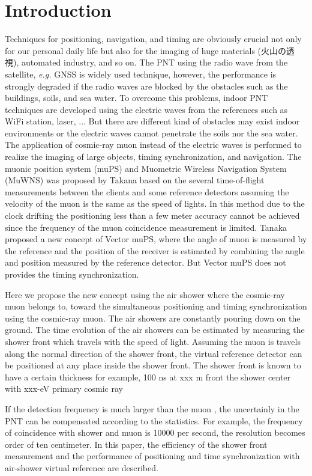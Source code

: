 \section{Introduction}


Techniques for positioning, navigation, and timing are obviously crucial not only for our personal daily life but also for the imaging of huge materials (火山の透視), automated industry, and so on. The PNT using the radio wave from the satellite, {\it e.g.} GNSS is widely used technique, however, the performance is strongly degraded if the radio waves are blocked by the obstacles such as the buildings, soils, and sea water. To overcome this problems, indoor PNT techniques are developed using the electric waves from the references such as WiFi station, laser, ... But there are different kind of obstacles may exist indoor environments or the electric waves cannot penetrate the soils nor the sea water. The application of cosmic-ray muon instead of the electric waves is performed to realize the imaging of large  objects, timing synchronization, and navigation. The muonic position system (muPS) and Muometric Wireless Navigation System  (MuWNS) was proposed by Takana based on the several time-of-flight measurements between the clients and some reference detectors assuming the velocity of the muon is the same as the speed of lights. In this method due to the clock drifting the positioning less than a few meter accuracy cannot be achieved since the frequency of the muon coincidence measurement is limited. Tanaka proposed a new concept of Vector muPS, where the angle of muon is measured by the reference and the position of the receiver is estimated by combining the angle and position measured by the reference detector. But Vector muPS does not provides the timing synchronization. 

Here we propose the new concept using the air shower where the cosmic-ray muon belongs to, toward the simultaneous positioning and timing synchronization using the cosmic-ray muon. The air showers are constantly pouring down on the ground.
The time evolution of the air showers can be estimated by measuring the shower front which travels with the speed of light. Assuming the muon is travels along the normal direction of the shower front, the virtual reference detector can be positioned at any place inside the shower front. The shower front is known to have a certain thickness for example, 100 ns at xxx m front the shower center with xxx-eV primary cosmic ray 

If the detection frequency is much larger than the muon , the uncertainly in the PNT can be compensated according to the statistics. For example, the frequency of coincidence with shower and muon is 10000 per second, the resolution becomes order of ten centimeter. In this paper, the efficiency of the shower front measurement and the performance of positioning and time synchronization with air-shower virtual reference are described.

